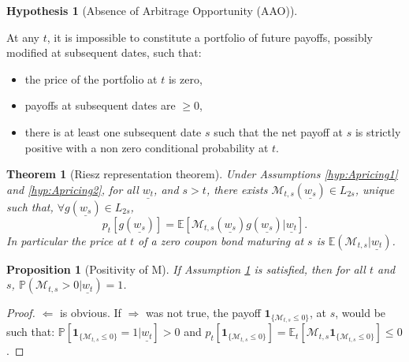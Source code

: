 \documentclass[
  12pt,
]{book}
\providecommand{\tightlist}{%
  \setlength{\itemsep}{0pt}\setlength{\parskip}{0pt}}
\newtheorem{theorem}{Theorem}[chapter]
\newtheorem{proposition}{Proposition}[chapter]
\theoremstyle{definition}
\theoremstyle{definition}
\theoremstyle{definition}
\theoremstyle{definition}
\newtheorem{hypothesis}{Hypothesis}[chapter]
\theoremstyle{remark}
\begin{document}
\begin{hypothesis}[Absence of Arbitrage Opportunity (AAO)]
\protect\hypertarget{hyp:Apricing3}{}\label{hyp:Apricing3}

At any \(t\), it is impossible to constitute a portfolio of future payoffs, possibly modified at subsequent dates, such that:

\begin{itemize}
\tightlist
\item
  the price of the portfolio at \(t\) is zero,
\item
  payoffs at subsequent dates are \(\ge 0\),
\item
  there is at least one subsequent date \(s\) such that the net payoff at \(s\) is strictly positive with a non zero conditional probability at \(t\).
\end{itemize}

\end{hypothesis}

\begin{theorem}[Riesz representation theorem]
\protect\hypertarget{thm:Riesz}{}\label{thm:Riesz}Under Assumptions \ref{hyp:Apricing1} and \ref{hyp:Apricing2}, for all \(\underline{w_t}\), and \(s > t\), there exists \(\mathcal{M}_{t,s}(\underline{w_s}) \in L_{2s}\), unique such that, \(\forall g(\underline{w_s}) \in L_{2s}\),
\[
p_t[g(\underline{w_s})] = \mathbb{E}[\mathcal{M}_{t,s}(\underline{w_s})g(\underline{w_s})|\underline{w_t}].
\]
In particular the price at \(t\) of a zero coupon bond maturing at \(s\) is \(\mathbb{E}(\mathcal{M}_{t,s}|\underline{w_t})\).
\end{theorem}

\begin{proposition}[Positivity of M]
\protect\hypertarget{prp:PositivityM}{}\label{prp:PositivityM}If Assumption \ref{hyp:Apricing3} is satisfied, then for all \(t\) and \(s\), \(\mathbb{P}(\mathcal{M}_{t,s}>0|\underline{w_t})=1\).
\end{proposition}

\begin{proof}
\(\Leftarrow\) is obvious. If \(\Rightarrow\) was not true, the payoff
\(\textbf{1}_{\{\mathcal{M}_{t,s} \le 0\}}\), at \(s\), would be such that:
\(\mathbb{P}[\textbf{1}_{\{\mathcal{M}_{t,s} \le 0\}}=1|\underline{w_t}] > 0\) and \(p_t[\textbf{1}_{\{\mathcal{M}_{t,s} \le 0\}}] = \mathbb{E}_t[\mathcal{M}_{t,s}\textbf{1}_{\{\mathcal{M}_{t,s} \le 0\}}] \le 0\).
\end{proof}
\end{document}

